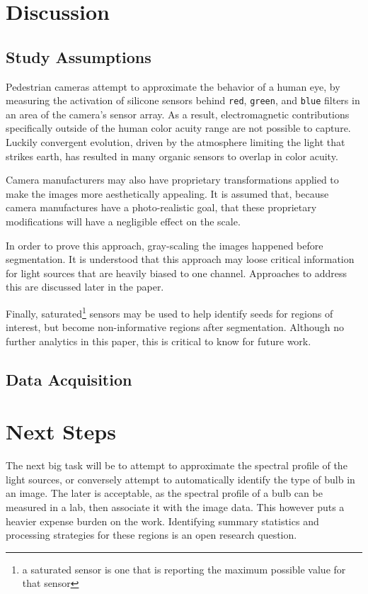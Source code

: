 \documentclass[11pt,twocolumn]{article} %
\def\rois{regions of interest\xspace}
\def\r{\texttt{red}\xspace}
\def\g{\texttt{green}\xspace}
\def\b{\texttt{blue}\xspace}
\begin{document}
\section{Discussion}

\subsection{Study Assumptions}
Pedestrian cameras attempt to approximate the behavior of a human eye, by measuring the activation of silicone sensors behind \r, \g, and \b filters in an area of the camera's sensor array. As a result, electromagnetic contributions specifically outside of the human color acuity range are not possible to capture. Luckily convergent evolution, driven by the atmosphere limiting the light that strikes earth, has resulted in many organic sensors to overlap in color acuity.

Camera manufacturers may also have proprietary transformations applied to make the images more aesthetically appealing. It is assumed that, because camera manufactures have a photo-realistic goal, that these proprietary modifications will have a negligible effect on the scale.

In order to prove this approach, gray-scaling the images happened before segmentation. It is understood that this approach may loose critical information for light sources that are heavily biased to one channel. Approaches to address this are discussed later in the paper.

Finally, saturated\footnote{a saturated sensor is one that is reporting the maximum possible value for that sensor} sensors may be used to help identify seeds for \rois, but become non-informative regions after segmentation. Although no further analytics in this paper, this is critical to know for future work.

\subsection{Data Acquisition}



\section{Next Steps}
The next big task will be to attempt to approximate the spectral profile of the light sources, or conversely attempt to automatically identify the type of bulb in an image. The later is acceptable, as the spectral profile of a bulb can be measured in a lab, then associate it with the image data. This however puts a heavier expense burden on the work. Identifying summary statistics and processing strategies for these regions is an open research question.
\end{document}
